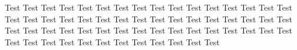 \documentclass[twocolumn,10pt]{article}
\begin{document}
Test Test Test Test Test Test Test Test Test Test Test Test Test Test Test Test Test Test Test Test Test Test Test Test Test Test Test Test Test Test Test Test Test Test Test Test Test Test Test Test Test Test Test Test Test Test Test Test Test Test Test Test Test Test Test Test Test Test Test Test 
\end{document}
